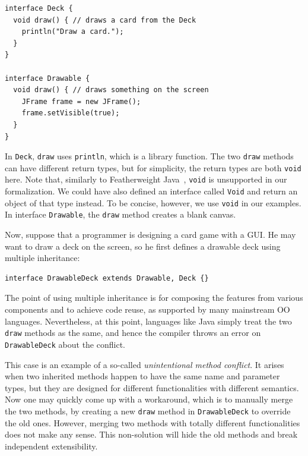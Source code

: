 \vspace{3pt}\begin{lstlisting}
interface Deck {
  void draw() { // draws a card from the Deck
    println("Draw a card.");
  }
}

interface Drawable {
  void draw() { // draws something on the screen
    JFrame frame = new JFrame();
    frame.setVisible(true);
  }
}
\end{lstlisting}\vspace{3pt}
In \lstinline|Deck|,
\lstinline|draw| uses \lstinline|println|, which is a
library function. 
The two \lstinline|draw| methods can have different return types, but for simplicity, 
the return types are both \lstinline|void| here. Note that, similarly to
Featherweight Java~\cite{Igarashi01FJ}, \lstinline|void| is
unsupported in our formalization. We could have also defined an interface called \lstinline|Void|
and return an object of that type instead. To be concise, however, we
use \lstinline|void| in our examples.
In interface \lstinline|Drawable|, the \lstinline|draw| method
creates a blank canvas.

Now, suppose that a programmer is designing a
card game with a GUI. He may want to draw a deck on the screen, so he first defines a drawable
deck using multiple inheritance:

\vspace{3pt}\begin{lstlisting}
interface DrawableDeck extends Drawable, Deck {} 
\end{lstlisting}\vspace{3pt}
The point of using multiple inheritance is for composing the features from various 
components and to achieve code reuse, as supported by many mainstream OO
languages. Nevertheless, at this point, languages like Java simply treat the two \lstinline|draw| methods
as the same, and hence the compiler throws an error
on \lstinline|DrawableDeck| about the conflict.

This case is an example of a so-called \textit{unintentional method conflict}. It arises when two inherited methods happen to have
the same name and parameter types, but they are designed for different functionalities with different semantics.
Now one may quickly come up with a workaround, which is to manually
merge the two methods, by
creating a new \lstinline|draw| method in \lstinline|DrawableDeck| to
override the old ones. However, merging two methods with totally different functionalities does not make any sense.
This non-solution will hide the
old methods and break independent extensibility.

